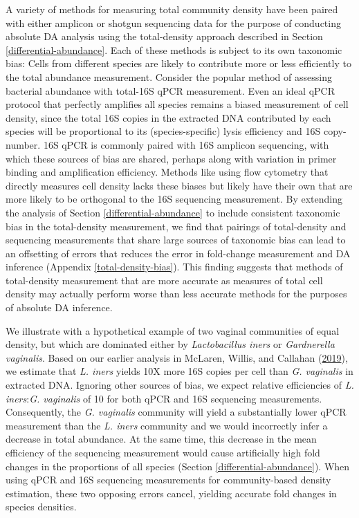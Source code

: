 \documentclass[
]{article}
\begin{document}
A variety of methods for measuring total community density have been paired with either amplicon or shotgun sequencing data for the purpose of conducting absolute DA analysis using the total-density approach described in Section \ref{differential-abundance}.
Each of these methods is subject to its own taxonomic bias: Cells from different species are likely to contribute more or less efficiently to the total abundance measurement.
Consider the popular method of assessing bacterial abundance with total-16S qPCR measurement.
Even an ideal qPCR protocol that perfectly amplifies all species remains a biased measurement of cell density, since the total 16S copies in the extracted DNA contributed by each species will be proportional to its (species-specific) lysis efficiency and 16S copy-number.
16S qPCR is commonly paired with 16S amplicon sequencing, with which these sources of bias are shared, perhaps along with variation in primer binding and amplification efficiency.
Methods like using flow cytometry that directly measures cell density lacks these biases but likely have their own that are more likely to be orthogonal to the 16S sequencing measurement.
By extending the analysis of Section \ref{differential-abundance} to include consistent taxonomic bias in the total-density measurement, we find that pairings of total-density and sequencing measurements that share large sources of taxonomic bias can lead to an offsetting of errors that reduces the error in fold-change measurement and DA inference (Appendix \ref{total-density-bias}).
This finding suggests that methods of total-density measurement that are more accurate as measures of total cell density may actually perform worse than less accurate methods for the purposes of absolute DA inference.

We illustrate with a hypothetical example of two vaginal communities of equal density, but which are dominated either by \emph{Lactobacillus iners} or \emph{Gardnerella vaginalis}.
Based on our earlier analysis in McLaren, Willis, and Callahan (\protect\hyperlink{ref-mclaren2019cons}{2019}), we estimate that \emph{L. iners} yields 10X more 16S copies per cell than \emph{G. vaginalis} in extracted DNA.
Ignoring other sources of bias, we expect relative efficiencies of \emph{L. iners}:\emph{G. vaginalis} of 10 for both qPCR and 16S sequencing measurements.
Consequently, the \emph{G. vaginalis} community will yield a substantially lower qPCR measurement than the \emph{L. iners} community and we would incorrectly infer a decrease in total abundance.
At the same time, this decrease in the mean efficiency of the sequencing measurement would cause artificially high fold changes in the proportions of all species (Section \ref{differential-abundance}).
When using qPCR and 16S sequencing measurements for community-based density estimation, these two opposing errors cancel, yielding accurate fold changes in species densities.
\end{document}
